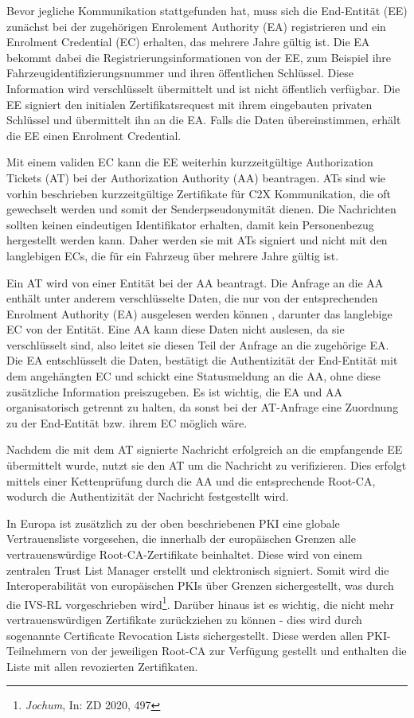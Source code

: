 Bevor jegliche Kommunikation stattgefunden hat, muss sich die End-Entität (EE) zunächst bei der zugehörigen Enrolement Authority (EA) registrieren und ein Enrolment Credential (EC) erhalten, das mehrere Jahre gültig ist. Die EA bekommt dabei die Registrierungsinformationen von der EE, zum Beispiel ihre Fahrzeugidentifizierungsnummer und ihren öffentlichen Schlüssel. Diese Information wird verschlüsselt übermittelt und ist nicht öffentlich verfügbar. Die EE signiert den initialen Zertifikatsrequest mit ihrem eingebauten privaten Schlüssel und übermittelt ihn an die EA. Falls die Daten übereinstimmen, erhält die EE einen Enrolment Credential.

Mit einem validen EC kann die EE weiterhin kurzzeitgültige Authorization Tickets (AT) bei der Authorization Authority (AA) beantragen. ATs sind wie vorhin beschrieben kurzzeitgültige Zertifikate für C2X Kommunikation, die oft gewechselt werden und somit der Senderpseudonymität dienen. Die Nachrichten sollten keinen eindeutigen Identifikator erhalten, damit kein Personenbezug hergestellt werden kann. Daher werden sie mit ATs signiert und nicht mit den langlebigen ECs, die für ein Fahrzeug über mehrere Jahre gültig ist. 

Ein AT wird von einer Entität bei der AA beantragt. Die Anfrage an die AA enthält unter anderem verschlüsselte Daten, die nur von der entsprechenden Enrolment Authority (EA) ausgelesen werden können \cite{ETSI2018}, darunter das langlebige EC von der Entität. Eine AA kann diese Daten nicht auslesen, da sie verschlüsselt sind, also leitet sie diesen Teil der Anfrage an die zugehörige EA. Die EA entschlüsselt die Daten, bestätigt die Authentizität der End-Entität mit dem angehängten EC und schickt eine Statusmeldung an die AA, ohne diese zusätzliche Information preiszugeben. Es ist wichtig, die EA und AA organisatorisch getrennt zu halten, da sonst bei der AT-Anfrage eine Zuordnung zu der End-Entität bzw. ihrem EC möglich wäre.

Nachdem die mit dem AT signierte Nachricht erfolgreich an die empfangende EE übermittelt wurde, nutzt sie den AT um die Nachricht zu verifizieren. Dies erfolgt mittels einer Kettenprüfung durch die AA und die entsprechende Root-CA, wodurch die Authentizität der Nachricht festgestellt wird.

In Europa ist zusätzlich zu der oben beschriebenen PKI eine globale Vertrauensliste vorgesehen, die innerhalb der europäischen Grenzen alle vertrauenswürdige Root-CA-Zertifikate beinhaltet. Diese wird von einem zentralen Trust List Manager erstellt und elektronisch signiert. Somit wird die Interoperabilität von europäischen PKIs über Grenzen sichergestellt, was durch die IVS-RL vorgeschrieben wird\footnote{\emph{Jochum}, In: ZD 2020, 497}. Darüber hinaus ist es wichtig, die nicht mehr vertrauenswürdigen Zertifikate zurückziehen zu können - dies wird durch sogenannte Certificate Revocation Lists sichergestellt. Diese werden allen PKI-Teilnehmern von der jeweiligen Root-CA zur Verfügung gestellt und enthalten die Liste mit allen revozierten Zertifikaten. 

